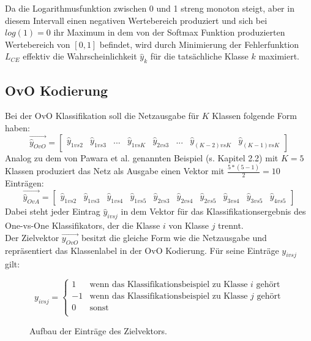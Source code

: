Da die Logarithmusfunktion zwischen 0 und 1 streng monoton steigt, aber in diesem Intervall einen negativen Wertebereich produziert und sich bei\\ $log(1)=0$ ihr Maximum in dem von der Softmax Funktion produzierten Wertebereich von $[0, 1]$ befindet, wird durch Minimierung der Fehlerfunktion $L_{CE}$ effektiv die Wahrscheinlichkeit $\widehat{y}_k$ für die tatsächliche Klasse $k$ maximiert.


\subsection{OvO Kodierung}
Bei der OvO Klassifikation soll die Netzausgabe für $K$ Klassen folgende Form haben:
\[\overrightarrow{\widehat{y}_{OvO}} = \begin{bmatrix}
\widehat{y}_{1vs2} & \widehat{y}_{1vs3} & ... & \widehat{y}_{1vsK} & \widehat{y}_{2vs3} &... & \widehat{y}_{(K-2)vs K} & \widehat{y}_{(K-1)vsK}
\end{bmatrix} \]
Analog zu dem von Pawara et al. genannten Beispiel (s. \cite{pawaraPaper} Kapitel 2.2) mit $K=5$ Klassen produziert das Netz als Ausgabe einen Vektor mit $\frac{5*(5-1)}{2}=10$ Einträgen:
\[\overrightarrow{\widehat{y}_{OvA}} = \begin{bmatrix}
\widehat{y}_{1vs2} & \widehat{y}_{1vs3} & \widehat{y}_{1vs4} & \widehat{y}_{1vs5} & \widehat{y}_{2vs3} & \widehat{y}_{2vs4} & \widehat{y}_{2vs5} & \widehat{y}_{3vs4} & \widehat{y}_{3vs5} & \widehat{y}_{4vs5}
\end{bmatrix} \]
Dabei steht jeder Eintrag $\widehat{y}_{ivsj}$ in dem Vektor für das Klassifikationsergebnis des One-vs-One Klassifikators, der die Klasse $i$ von Klasse $j$ trennt.\\

Der Zielvektor $\overrightarrow{y_{OvO}}$ besitzt die gleiche Form wie die Netzausgabe und repräsentiert das Klassenlabel in der OvO Kodierung. Für seine Einträge $y_{ivsj}$ gilt:
\begin{figure}[H]
\[
y_{ivsj} = 
\begin{cases}
1 & \text{wenn das Klassifikationsbeispiel zu Klasse } i \text{ gehört}\\
-1 & \text{wenn das Klassifikationsbeispiel zu Klasse } j \text{ gehört}\\
0 & \text{sonst}\\
\end{cases}
\]
\caption{Aufbau der Einträge des Zielvektors.}
\label{gl:OvOZielvektor}
\end{figure}

